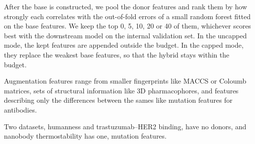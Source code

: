 After the base is constructed, we pool the donor features and rank them by how strongly each correlates with the out-of-fold errors of a small random forest fitted on the base features. We keep the top 0, 5, 10, 20 or 40 of them, whichever scores best with the downstream model on the internal validation set. In the uncapped mode, the kept features are appended outside the budget. In the capped mode, they replace the weakest base features, so that the hybrid stays within the budget.

Augmentation features range from smaller fingerprints like MACCS or Coloumb matrices, sets of structural information like 3D pharmacophores, and features describing only the differences between the sames like mutation features for antibodies.

Two datasets, humanness and trastuzumab--HER2 binding, have no donors, and nanobody thermostability has one, mutation features.

